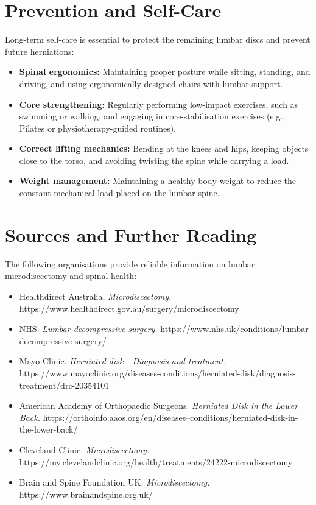 \section*{Prevention and Self-Care}
Long-term self-care is essential to protect the remaining lumbar discs and prevent future herniations:
\begin{itemize}
    \item \textbf{Spinal ergonomics:} Maintaining proper posture while sitting, standing, and driving, and using ergonomically designed chairs with lumbar support.
    \item \textbf{Core strengthening:} Regularly performing low-impact exercises, such as swimming or walking, and engaging in core-stabilisation exercises (e.g., Pilates or physiotherapy-guided routines).
    \item \textbf{Correct lifting mechanics:} Bending at the knees and hips, keeping objects close to the torso, and avoiding twisting the spine while carrying a load.
    \item \textbf{Weight management:} Maintaining a healthy body weight to reduce the constant mechanical load placed on the lumbar spine.
\end{itemize}

\section*{Sources and Further Reading}
The following organisations provide reliable information on lumbar microdiscectomy and spinal health:
\begin{itemize}
    \item Healthdirect Australia. \textit{Microdiscectomy.} https://www.healthdirect.gov.au/surgery/microdiscectomy
    \item NHS. \textit{Lumbar decompressive surgery.} https://www.nhs.uk/conditions/lumbar-decompressive-surgery/
    \item Mayo Clinic. \textit{Herniated disk - Diagnosis and treatment.} https://www.mayoclinic.org/diseases-conditions/herniated-disk/diagnosis-treatment/drc-20354101
    \item American Academy of Orthopaedic Surgeons. \textit{Herniated Disk in the Lower Back.} https://orthoinfo.aaos.org/en/diseases--conditions/herniated-disk-in-the-lower-back/
    \item Cleveland Clinic. \textit{Microdiscectomy.} https://my.clevelandclinic.org/health/treatments/24222-microdiscectomy
    \item Brain and Spine Foundation UK. \textit{Microdiscectomy.} https://www.brainandspine.org.uk/
\end{itemize}
